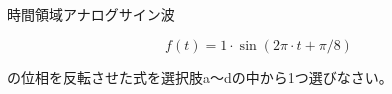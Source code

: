 時間領域アナログサイン波

\[
f(t) = 1 \cdot \sin( 2\pi \cdot t + \pi/8 )
\]

\bigskip
\noindent  の位相を反転させた式を選択肢a〜dの中から1つ選びなさい。
